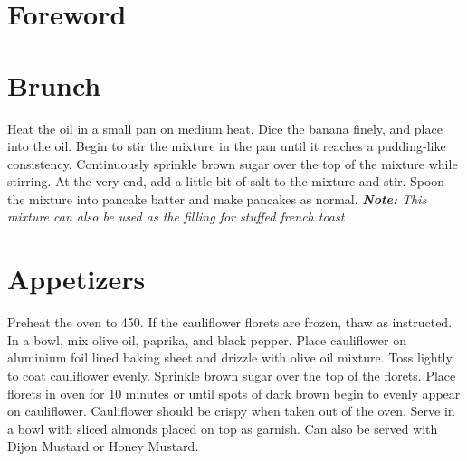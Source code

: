 \documentclass[oneside]{recipe}
\begin{document}
\tableofcontents
\chapter{Foreword}


\chapter{Brunch}




Heat the oil in a small pan on medium heat. Dice the banana finely, and place into the oil. Begin to stir the mixture in the pan until it reaches a pudding-like consistency. 
Continuously sprinkle brown sugar over the top of the mixture while stirring. At the very end, add a little bit of salt to the mixture and stir. Spoon the mixture into pancake batter and make pancakes as normal. \textit{\textbf{Note:} This mixture can also be used as the filling for stuffed french toast}





\chapter{Appetizers}
Preheat the oven to 450. If the cauliflower florets are frozen, thaw as instructed. In a bowl, mix olive oil, paprika, and black pepper. Place cauliflower on aluminium foil lined baking sheet and drizzle with olive oil mixture. Toss lightly to coat cauliflower evenly. Sprinkle brown sugar over the top of the florets. Place florets in oven for 10 minutes or until spots of dark brown begin to evenly appear on cauliflower. Cauliflower should be crispy when taken out of the oven. Serve in a bowl with sliced almonds placed on top as garnish. Can also be served with Dijon Mustard or Honey Mustard.
\end{document}
